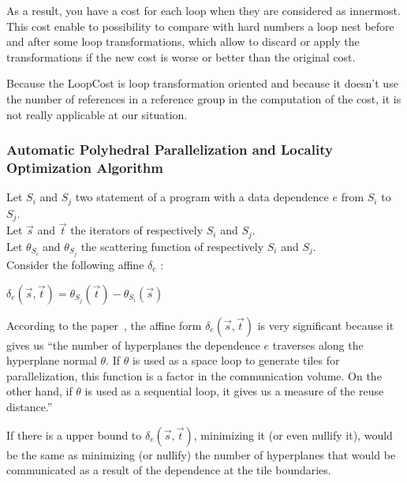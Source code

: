 \documentclass[paper=a4, fontsize=11pt]{scrartcl}
\numberwithin{equation}{section}        %
\numberwithin{figure}{section}          %
\numberwithin{table}{section}               %
\begin{document}
            As a result, you have a cost for each loop when they are considered as innermost.
            This cost enable to possibility to compare with hard numbers
            a loop nest before and after some loop transformations, which allow to discard
            or apply the transformations if the new cost is worse or better than the
            original cost.
            \bigskip

            Because the LoopCost is loop transformation oriented and because it doesn't
            use the number of references in a reference group in the computation
            of the cost, it is not really applicable at our situation.
        \subsubsection{Automatic Polyhedral Parallelization and Locality Optimization Algorithm}
            Let $S_i$ and $S_j$ two statement of a program with a data dependence $e$
            from $S_i$ to $S_j$.\\
            Let $\vec{s}$ and $\vec{t}$ the iterators of respectively $S_i$ and $S_j$.\\
            Let $\theta_{S_i}$ and $\theta_{S_j}$ the scattering function of respectively $S_i$
            and $S_j$.\\
            Consider the following affine $\delta_e$ :
            \begin{center}
                $\delta_e\left(\vec{s},\vec{t}\right) = \theta_{S_j}\left(\vec{t}\right) - \theta_{S_i}\left(\vec{s}\right)$
            \end{center}

            According to the paper~\cite{Bondhugula:2008:PAP:1379022.1375595},
            the affine form $\delta_e\left(\vec{s},\vec{t}\right)$ is very significant
            because it gives us ``the number of hyperplanes the dependence $e$ traverses
            along the hyperplane normal $\theta$. If $\theta$ is used as a space loop to generate tiles
            for parallelization, this function is a factor in the communication
            volume. On the other hand, if $\theta$ is used as a sequential loop, it
            gives us a measure of the reuse distance.''

            If there is a upper bound to $\delta_e\left(\vec{s},\vec{t}\right)$,
            minimizing it (or even nullify it), would be the same as minimizing (or nullify)
            the number of hyperplanes that would be communicated as a result of
            the dependence at the tile boundaries.
\end{document}
